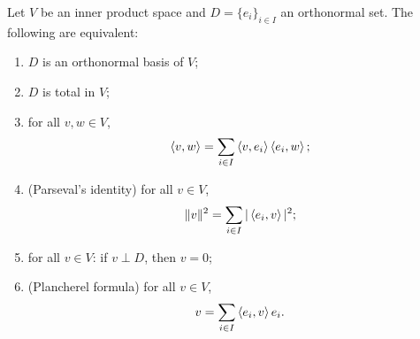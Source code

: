 \begin{proposition} \label{prop:totalONBParsevalEquivalence} \label{prop:plancherel}
Let $V$ be an inner product space and $D = \{e_i\}_{i\in I}$ an orthonormal set. The following are equivalent:
\begin{enumerate}
\item $D$ is an orthonormal basis of $V$;
\item $D$ is total in $V$;
\item for all $v,w\in V$,
\[ \left\langle v,w \right\rangle = \sum_{i\in I}\left\langle v,e_i \right\rangle\left\langle e_i,w \right\rangle; \]
\item \textup{(Parseval's identity)} for all $v\in V$,
\[ \lVert v\rVert^2 = \sum_{i\in I}|\left\langle e_i,v \right\rangle|^2; \]
\item for all $v\in V$: if $v\perp D$, then $v=0$;
\item \textup{(Plancherel formula)} for all $v\in V$,
\[ v = \sum_{i\in I}\left\langle e_{i},v \right\rangle e_{i}. \]
\end{enumerate}
\end{proposition}

